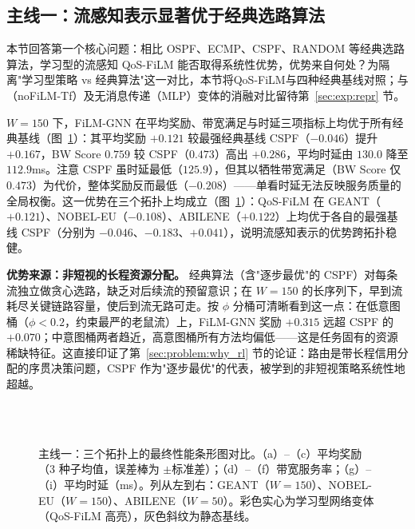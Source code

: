 \subsection{主线一：流感知表示显著优于经典选路算法}
\label{sec:exp:main}

本节回答第一个核心问题：相比 OSPF、ECMP、CSPF、RANDOM 等经典选路算法，学习型的流感知 QoS-FiLM 能否取得系统性优势，优势来自何处？为隔离"学习型策略 vs 经典算法"这一对比，本节将QoS-FiLM与四种经典基线对照；与（noFiLM-Tf）及无消息传递（MLP）变体的消融对比留待第~\ref{sec:exp:repr} 节。

$W\!=\!150$ 下，FiLM-GNN 在平均奖励、带宽满足与时延三项指标上均优于所有经典基线（图~\ref{fig:main_bars}）：其平均奖励 $+0.121$ 较最强经典基线 CSPF（$-0.046$）提升 $+0.167$，BW Score $0.759$ 较 CSPF（$0.473$）高出 $+0.286$，平均时延由 $130.0$ 降至 $112.9$ms。注意 CSPF 虽时延最低（$125.9$），但其以牺牲带宽满足（BW Score 仅 $0.473$）为代价，整体奖励反而最低（$-0.208$）——单看时延无法反映服务质量的全局权衡。这一优势在三个拓扑上均成立（图~\ref{fig:main_bars}）：QoS-FiLM 在 GEANT（$+0.121$）、NOBEL-EU（$-0.108$）、ABILENE（$+0.122$）上均优于各自的最强基线 CSPF（分别为 $-0.046$、$-0.183$、$+0.041$），说明流感知表示的优势跨拓扑稳健。

\textbf{优势来源：非短视的长程资源分配。} 经典算法（含"逐步最优"的 CSPF）对每条流独立做贪心选路，缺乏对后续流的预留意识；在 $W\!=\!150$ 的长序列下，早到流耗尽关键链路容量，使后到流无路可走。按 $\phi$ 分桶可清晰看到这一点：在低意图桶（$\phi<0.2$，约束最严的老鼠流）上，FiLM-GNN 奖励 $+0.315$ 远超 CSPF 的 $+0.070$；中意图桶两者趋近，高意图桶所有方法均偏低——这是任务固有的资源稀缺特征。这直接印证了第~\ref{sec:problem:why_rl} 节的论证：路由是带长程信用分配的序贯决策问题，CSPF 作为"逐步最优"的代表，被学到的非短视策略系统性地超越。

\begin{figure}[t]
\centering
{}\hfill
{}\hfill
{}\\[4pt]
\hfill
{}\hfill
{}\\[4pt]
\hfill
{}\hfill
{}
\caption{主线一：三个拓扑上的最终性能条形图对比。（a）--（c）平均奖励（3 种子均值，误差棒为 $\pm$标准差）；（d）--（f）带宽服务率；（g）--（i）平均时延（ms）。列从左到右：GEANT（$W\!=\!150$）、NOBEL-EU（$W\!=\!150$）、ABILENE（$W\!=\!50$）。彩色实心为学习型网络变体（QoS-FiLM 高亮），灰色斜纹为静态基线。}
\label{fig:main_bars}
\end{figure}

